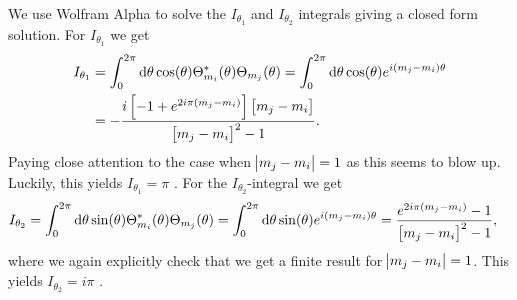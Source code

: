             We use Wolfram Alpha to solve the $I_{\theta_1}$ and $I_{\theta_2}$
            integrals giving a closed form solution. For $I_{\theta_1}$ we get
            \cite{wolframalphai1}
            \begin{align}
                I_{\theta_1}
                &=
                \int_{0}^{2\pi} \mathrm{d} \theta \cos(\theta)
                \Theta_{m_i}^{*}(\theta) \Theta_{m_j}(\theta)
                =
                \int_{0}^{2\pi} \mathrm{d} \theta \cos(\theta)
                e^{i(m_j - m_i)\theta}
                \\
                &=
                - \frac{
                    i\left[ 
                        -1 + e^{2i\pi(m_j - m_i)}
                     \right]\left[ m_j - m_i \right]
                }{
                    \left[ m_j - m_i \right]^2 - 1
                }.
            \end{align}
            Paying close attention to the case when $\abs{m_j - m_i} = 1$ as
            this seems to blow up. Luckily, this yields $I_{\theta_1} = \pi$
            \cite{wolframalphai1-zero}. For the $I_{\theta_2}$-integral we get
            \cite{wolframalphai2}
            \begin{align}
                I_{\theta_2}
                &=
                \int_{0}^{2\pi} \mathrm{d} \theta \sin(\theta)
                \Theta_{m_i}^{*}(\theta) \Theta_{m_j}(\theta)
                =
                \int_{0}^{2\pi} \mathrm{d} \theta \sin(\theta)
                e^{i(m_j - m_i)\theta}
                =
                \frac{e^{2i\pi(m_j - m_i)} - 1}{\left[ m_j - m_i \right]^2 - 1},
            \end{align}
            where we again explicitly check that we get a finite result for
            $\abs{m_j - m_i} = 1$. This yields $I_{\theta_2} = i\pi$
            \cite{wolframalphai2-zero}.

